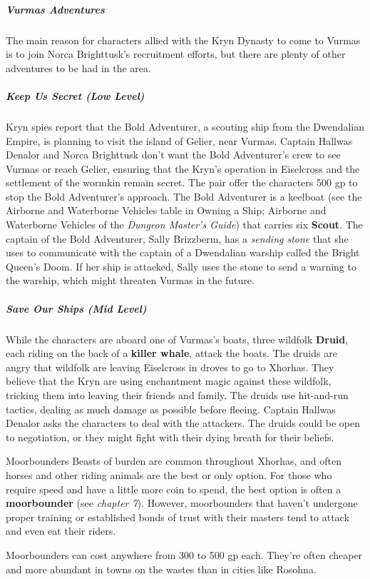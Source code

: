 \documentclass[10pt,a4paper,twoside,bg=print,twocolumn,openany,nodeprecatedcode]{dndbook}
\begin{document}
\subparagraph{Vurmas Adventures}
The main reason for characters allied with the Kryn Dynasty to come to Vurmas is to join Norca Brighttusk's recruitment efforts, but there are plenty of other adventures to be had in the area.

\subparagraph{Keep Us Secret (Low Level)}
Kryn spies report that the Bold Adventurer, a scouting ship from the Dwendalian Empire, is planning to visit the island of Gelier, near Vurmas. Captain Hallwas Denalor and Norca Brighttusk don't want the Bold Adventurer's crew to see Vurmas or reach Gelier, ensuring that the Kryn's operation in Eiselcross and the settlement of the wormkin remain secret. The pair offer the characters 500 gp to stop the Bold Adventurer's approach. The Bold Adventurer is a keelboat (see the Airborne and Waterborne Vehicles table in Owning a Ship; Airborne and Waterborne Vehicles of the \textit{Dungeon Master's Guide}) that carries six \textbf{Scout}. The captain of the Bold Adventurer, Sally Brizzberm, has a \textit{sending stone} that she uses to communicate with the captain of a Dwendalian warship called the Bright Queen's Doom. If her ship is attacked, Sally uses the stone to send a warning to the warship, which might threaten Vurmas in the future.

\subparagraph{Save Our Ships (Mid Level)}
While the characters are aboard one of Vurmas's boats, three wildfolk \textbf{Druid}, each riding on the back of a \textbf{killer whale}, attack the boats. The druids are angry that wildfolk are leaving Eiselcross in droves to go to Xhorhas. They believe that the Kryn are using enchantment magic against these wildfolk, tricking them into leaving their friends and family. The druids use hit-and-run tactics, dealing as much damage as possible before fleeing. Captain Hallwas Denalor asks the characters to deal with the attackers. The druids could be open to negotiation, or they might fight with their dying breath for their beliefs.

\begin{DndSidebar}[float=!b]{Moorbounders}
Beasts of burden are common throughout Xhorhas, and often horses and other riding animals are the best or only option. For those who require speed and have a little more coin to spend, the best option is often a \textbf{moorbounder} (see \textit{chapter 7}). However, moorbounders that haven't undergone proper training or established bonds of trust with their masters tend to attack and even eat their riders.



Moorbounders can cost anywhere from 300 to 500 gp each. They're often cheaper and more abundant in towns on the wastes than in cities like Rosohna.



\end{DndSidebar}
\end{document}
